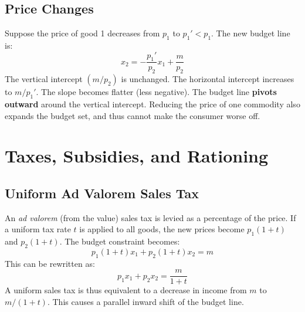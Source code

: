 \subsection{Price Changes}
Suppose the price of good 1 decreases from $p_1$ to $p_1' < p_1$. The new budget line is:
\[ x_2 = -\frac{p_1'}{p_2}x_1 + \frac{m}{p_2} \]
The vertical intercept $(m/p_2)$ is unchanged. The horizontal intercept increases to $m/p_1'$. The slope becomes flatter (less negative). The budget line \textbf{pivots outward} around the vertical intercept. Reducing the price of one commodity also expands the budget set, and thus cannot make the consumer worse off.

\section{Taxes, Subsidies, and Rationing}

\subsection{Uniform Ad Valorem Sales Tax}
An \textit{ad valorem} (from the value) sales tax is levied as a percentage of the price. If a uniform tax rate $t$ is applied to all goods, the new prices become $p_1(1+t)$ and $p_2(1+t)$. The budget constraint becomes:
\[ p_1(1+t)x_1 + p_2(1+t)x_2 = m \]
This can be rewritten as:
\[ p_1x_1 + p_2x_2 = \frac{m}{1+t} \]
A uniform sales tax is thus equivalent to a decrease in income from $m$ to $m/(1+t)$. This causes a parallel inward shift of the budget line.


